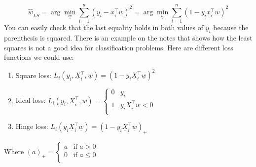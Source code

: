 \[
    \underline{\hat{w}}_{LS} = \arg \min_{\underline{w}} \sum_{i=1}^n (y_i - \underline{x}_i^\intercal \underline{w})^2 = \arg \min_{\underline{w}} \sum_{i=1}^n (1 - y_i\underline{x}_i^\intercal \underline{w})^2    
\]
You can easily check that the last equality holds in both values of $y_i$ because the parenthesis is squared.
There is an example on the notes that shows how the least squares is not a good idea for classification problems. Here are different loss functions we could use:
\begin{enumerate}
    \item Square loss: $L_i(y_i, \underline{X}_i^\intercal, \underline{w}) = (1 - y_i\underline{X}_i^\intercal \underline{w})^2$
    \item Ideal loss: $L_i(y_i, \underline{X}_i^\intercal, \underline{w}) = \begin{cases}
        0 & y_i\\
        1 & y_i\underline{X}_i^\intercal \underline{w} < 0\\
    \end{cases}$
    \item Hinge loss: $L_i(y_i\underline{X}_i^\intercal \underline{w}) = (1 - y_i\underline{X}_i^\intercal \underline{w})_{+}$
\end{enumerate}
Where $(a)_{+} = \begin{cases}
    a & \text{if } a > 0\\
    0 & \text{if } a \leq 0\\
\end{cases}$

